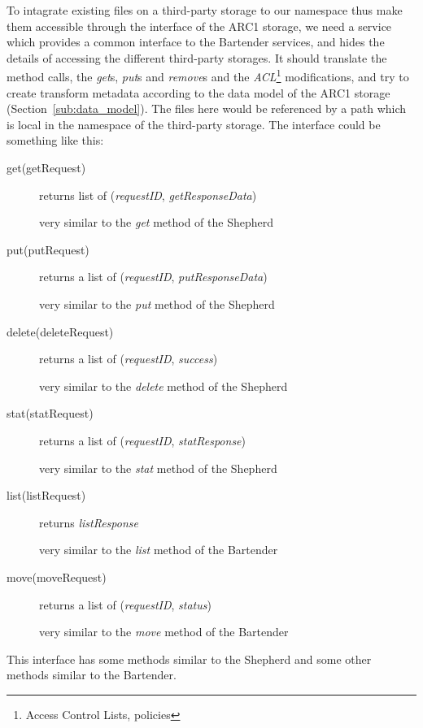 \documentclass{book}
\begin{document}
To intagrate existing files on a third-party storage to our namespace thus make them accessible through the interface of the ARC1 storage, we need a service which provides a common interface to the Bartender services, and hides the details of accessing the different third-party storages. It should translate the method calls, the \emph{get}s, \emph{put}s and \emph{remove}s and the \emph{ACL}\footnote{Access Control Lists, policies} modifications, and try to create transform metadata according to the data model of the ARC1 storage (Section~\ref{sub:data_model}). The files here would be referenced by a path which is local in the namespace of the third-party storage. The interface could be something like this:
\begin{description}
    \item[get(getRequest)] returns list of (\emph{requestID}, \emph{getResponseData})

    very similar to the \emph{get} method of the Shepherd

    \item[put(putRequest)] returns a list of (\emph{requestID}, \emph{putResponseData})

    very similar to the \emph{put} method of the Shepherd

    \item[delete(deleteRequest)] returns a list of (\emph{requestID}, \emph{success})

    very similar to the \emph{delete} method of the Shepherd

    \item[stat(statRequest)] returns a list of (\emph{requestID}, \emph{statResponse})

    very similar to the \emph{stat} method of the Shepherd

    \item[list(listRequest)] returns \emph{listResponse}

    very similar to the \emph{list} method of the Bartender

    \item[move(moveRequest)] returns a list of (\emph{requestID}, \emph{status})

    very similar to the \emph{move} method of the Bartender

\end{description}
This interface has some methods similar to the Shepherd and some other methods similar to the Bartender.
\end{document}
